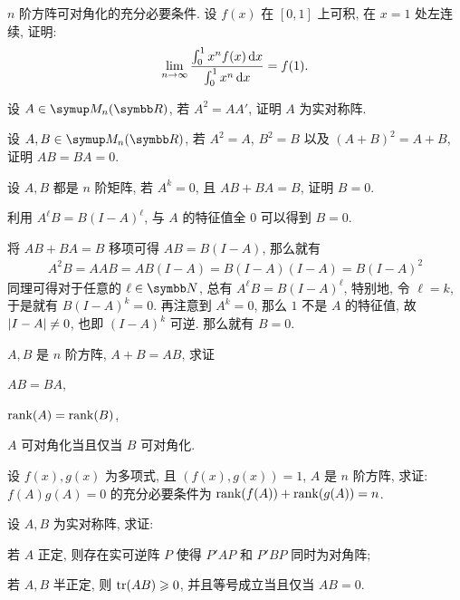 \begin{exercise}[series=exer]
    \item $ n $ 阶方阵可对角化的充分必要条件.
    \hitem 设 $ f(x) $ 在 $ [0, 1] $ 上可积, 在 $ x = 1 $ 处左连续, 证明:
    \begin{align*}
        \lim_{n \to \infty}\frac{\int_{0}^{1} x^{n} f(x) \dd{x}}{\int_{0}^{1} x^{n} \dd{x}} = f(1).
    \end{align*}
    \item 设 $ A \in \MM $, 若 $ A^{2} = AA' $, 证明 $ A $ 为实对称阵.
    \item 设 $ A, B \in \MM $, 若 $ A^{2} = A $, $ B^{2} = B $ 以及 $ (A + B)^{2} = A + B $, 证明 $ AB = BA = 0 $.  
    \item 设 $ A, B $ 都是 $ n $ 阶矩阵, 若 $ A^{k} = 0 $, 且 $ AB + BA = B $, 证明 $ B = 0 $. 
    \begin{hint}
        利用 $ A^{\ell}B = B(I - A)^{\ell} $, 与 $ A $ 的特征值全 $ 0 $ 可以得到 $ B = 0 $.
    \end{hint}
    \begin{answer}
        将 $ AB + BA = B $ 移项可得 $ AB = B(I - A) $, 那么就有
        \begin{align*}
            A^{2}B = AAB = AB(I - A) = B(I - A)(I - A) = B(I - A)^{2}
        \end{align*}
        同理可得对于任意的 $ \ell \in \N $, 总有 $ A^{\ell}B = B(I - A)^{\ell} $, 特别地, 令 $ \ell = k $, 于是就有 $ B(I - A)^{k} = 0 $. 再注意到 $ A^{k} = 0 $, 那么 $ 1 $ 不是 $ A $ 的特征值, 故 $ \abs{I - A} \ne 0 $, 也即 $ (I - A)^{k} $ 可逆. 那么就有 $ B = 0 $.
    \end{answer}
    \item $ A, B $ 是 $ n $ 阶方阵, $ A + B = AB $, 求证
    \begin{exercise}
        \item $ AB = BA $,
        \item $ \rank(A) = \rank(B) $,
        \item $ A $ 可对角化当且仅当 $ B $ 可对角化.
    \end{exercise}
    \item 设 $ f(x), g(x) $ 为多项式, 且 $ (f(x), g(x)) = 1 $, $ A $ 是 $ n $ 阶方阵, 求证: $ f(A)g(A) = 0 $ 的充分必要条件为 $ \rank(f(A)) + \rank(g(A)) = n $.
    \item 设 $ A, B $ 为实对称阵, 求证:
    \begin{exercise}
        \item 若 $ A $ 正定, 则存在实可逆阵 $ P $ 使得 $ P'AP $ 和 $ P'BP $ 同时为对角阵;
        \item 若 $ A, B $ 半正定, 则 $ \tr(AB) \geqslant 0 $, 并且等号成立当且仅当 $ AB = 0 $.

\end{exercise}
\end{exercise}
